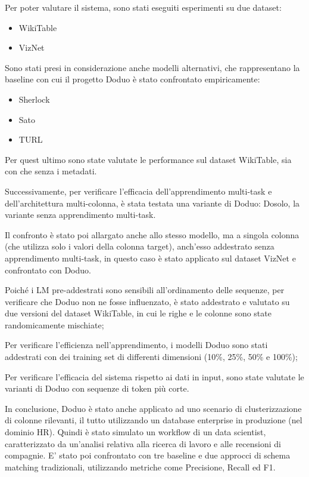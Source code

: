 Per poter valutare il sistema, sono stati eseguiti esperimenti su due dataset: 

\begin{itemize}
    \item WikiTable
    \item VizNet
\end{itemize}

Sono stati presi in considerazione anche modelli alternativi, che rappresentano la baseline con cui il progetto Doduo è stato confrontato empiricamente:

\begin{itemize}
    \item Sherlock
    \item Sato
    \item TURL
\end{itemize}

Per quest ultimo sono state valutate le performance sul dataset WikiTable, sia con che senza i metadati.

Successivamente, per verificare l'efficacia dell'apprendimento multi-task e dell'architettura multi-colonna, è stata testata una variante di Doduo: Dosolo, la variante senza apprendimento multi-task.

Il confronto è stato poi allargato anche allo stesso modello, ma a singola colonna (che utilizza solo i valori della colonna target), anch'esso addestrato senza apprendimento multi-task, in questo caso è stato applicato sul dataset VizNet e confrontato con Doduo.

Poiché i LM pre-addestrati sono sensibili all'ordinamento delle sequenze, per verificare che Doduo non ne fosse influenzato, è stato addestrato e valutato su due versioni del dataset WikiTable, in cui le righe e le colonne sono state randomicamente mischiate;

Per verificare l'efficienza nell'apprendimento, i modelli Doduo sono stati addestrati con dei training set di differenti dimensioni (10\%, 25\%, 50\% e 100\%);

Per verificare l'efficacia del sistema rispetto ai dati in input, sono state valutate le varianti di Doduo con sequenze di token più corte.

In conclusione, Doduo è stato anche applicato ad uno scenario di clusterizzazione di colonne rilevanti, il tutto utilizzando un database enterprise in produzione (nel dominio HR). Quindi è stato simulato un workflow di un data scientist, caratterizzato da un'analisi relativa alla ricerca di lavoro e alle recensioni di compagnie. E' stato poi confrontato con tre baseline e due approcci di schema matching tradizionali, utilizzando metriche come Precisione, Recall ed F1. 